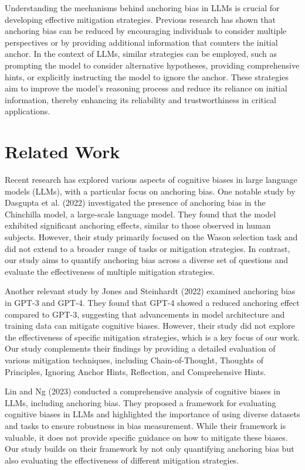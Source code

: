 \documentclass{article}
\begin{document}
Understanding the mechanisms behind anchoring bias in LLMs is crucial for developing effective mitigation strategies. Previous research has shown that anchoring bias can be reduced by encouraging individuals to consider multiple perspectives or by providing additional information that counters the initial anchor. In the context of LLMs, similar strategies can be employed, such as prompting the model to consider alternative hypotheses, providing comprehensive hints, or explicitly instructing the model to ignore the anchor. These strategies aim to improve the model's reasoning process and reduce its reliance on initial information, thereby enhancing its reliability and trustworthiness in critical applications.

\section{Related Work}
Recent research has explored various aspects of cognitive biases in large language models (LLMs), with a particular focus on anchoring bias. One notable study by Dasgupta et al. (2022) investigated the presence of anchoring bias in the Chinchilla model, a large-scale language model. They found that the model exhibited significant anchoring effects, similar to those observed in human subjects. However, their study primarily focused on the Wason selection task and did not extend to a broader range of tasks or mitigation strategies. In contrast, our study aims to quantify anchoring bias across a diverse set of questions and evaluate the effectiveness of multiple mitigation strategies.

Another relevant study by Jones and Steinhardt (2022) examined anchoring bias in GPT-3 and GPT-4. They found that GPT-4 showed a reduced anchoring effect compared to GPT-3, suggesting that advancements in model architecture and training data can mitigate cognitive biases. However, their study did not explore the effectiveness of specific mitigation strategies, which is a key focus of our work. Our study complements their findings by providing a detailed evaluation of various mitigation techniques, including Chain-of-Thought, Thoughts of Principles, Ignoring Anchor Hints, Reflection, and Comprehensive Hints.

Lin and Ng (2023) conducted a comprehensive analysis of cognitive biases in LLMs, including anchoring bias. They proposed a framework for evaluating cognitive biases in LLMs and highlighted the importance of using diverse datasets and tasks to ensure robustness in bias measurement. While their framework is valuable, it does not provide specific guidance on how to mitigate these biases. Our study builds on their framework by not only quantifying anchoring bias but also evaluating the effectiveness of different mitigation strategies.
\end{document}
